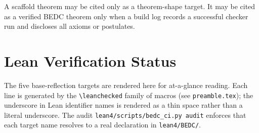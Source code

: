 \begin{principle}
\label{prin:no-scaffold-laundering}
A scaffold theorem may be cited only as a theorem-shape target. It may be cited as a verified BEDC theorem only when a build log records a successful checker run and discloses all axioms or postulates.
\end{principle}

\section{Lean Verification Status}
\label{sec:lean-verification-status}

The five base-reflection targets are rendered here for at-a-glance reading.
Each line is generated by the \texttt{\textbackslash leanchecked} family of macros
(see \texttt{preamble.tex}); the underscore in Lean identifier names is rendered
as a thin space rather than a literal underscore. The audit
\texttt{lean4/scripts/bedc\_ci.py audit} enforces that each target name resolves
to a real declaration in \texttt{lean4/BEDC/}.

